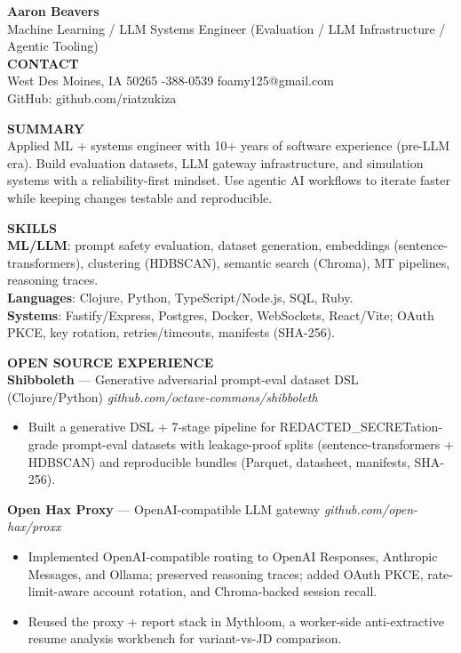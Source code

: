 \documentclass[10pt]{article}
\begin{document}
{\LARGE \textbf{Aaron Beavers}}\\
Machine Learning / LLM Systems Engineer (Evaluation / LLM Infrastructure / Agentic Tooling)\\

\vspace{2pt}
\textbf{CONTACT}\\
West Des Moines, IA 50265 \;\;\textbar\;-388-0539 \;\;\textbar\;\; foamy125@gmail.com\\
GitHub: github.com/riatzukiza

\vspace{4pt}
\textbf{SUMMARY}\\
Applied ML + systems engineer with 10+ years of software experience (pre-LLM era). Build evaluation datasets, LLM gateway infrastructure, and simulation systems with a reliability-first mindset. Use agentic AI workflows to iterate faster while keeping changes testable and reproducible.

\vspace{2pt}
\textbf{SKILLS}\\
\textbf{ML/LLM}: prompt safety evaluation, dataset generation, embeddings (sentence-transformers), clustering (HDBSCAN), semantic search (Chroma), MT pipelines, reasoning traces.\\
\textbf{Languages}: Clojure, Python, TypeScript/Node.js, SQL, Ruby.\\
\textbf{Systems}: Fastify/Express, Postgres, Docker, WebSockets, React/Vite; OAuth PKCE, key rotation, retries/timeouts, manifests (SHA-256).

\vspace{4pt}
\textbf{OPEN SOURCE EXPERIENCE}\\

\textbf{Shibboleth} --- Generative adversarial prompt-eval dataset DSL (Clojure/Python) \hfill \textit{github.com/octave-commons/shibboleth}\\
\vspace{-6pt}
\begin{itemize}
  \setlength\itemsep{-2pt}
  \setlength\parskip{0pt}
  \setlength\parsep{0pt}
  \item Built a generative DSL + 7-stage pipeline for REDACTED_SECRETation-grade prompt-eval datasets with leakage-proof splits (sentence-transformers + HDBSCAN) and reproducible bundles (Parquet, datasheet, manifests, SHA-256).
\end{itemize}

\textbf{Open Hax Proxy} --- OpenAI-compatible LLM gateway \hfill \textit{github.com/open-hax/proxx}\\
\vspace{-6pt}
\begin{itemize}
  \setlength\itemsep{-2pt}
  \setlength\parskip{0pt}
  \setlength\parsep{0pt}
  \item Implemented OpenAI-compatible routing to OpenAI Responses, Anthropic Messages, and Ollama; preserved reasoning traces; added OAuth PKCE, rate-limit-aware account rotation, and Chroma-backed session recall.
  \item Reused the proxy + report stack in Mythloom, a worker-side anti-extractive resume analysis workbench for variant-vs-JD comparison.
\end{itemize}
\end{document}
